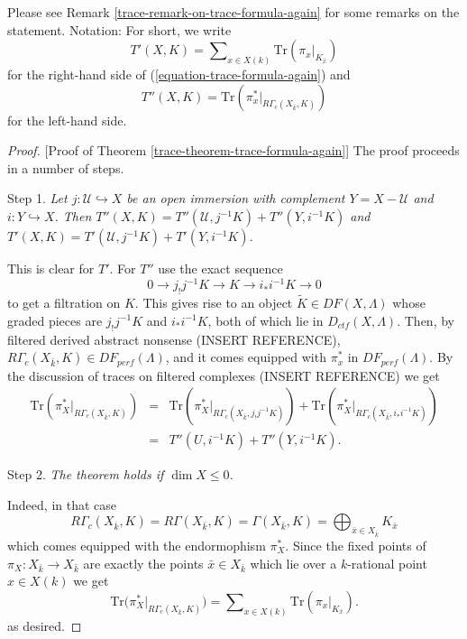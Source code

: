 Please see Remark \ref{trace-remark-on-trace-formula-again} for some remarks
on the statement. Notation: For short, we write
$$
T'(X, K) =
\sum\nolimits_{x\in X(k)}
\text{Tr}(\pi_x |_{K_{\bar x}})
$$
for the right-hand side of (\ref{equation-trace-formula-again}) and
$$
T''(X, K)
=\text{Tr}(\pi_x^* |_{R\Gamma_c(X_{\bar k}, K)})
$$
for the left-hand side.

\begin{proof}
[Proof of Theorem \ref{trace-theorem-trace-formula-again}]
The proof proceeds in a number of steps.

\medskip\noindent
Step 1. {\it Let $j : \mathcal{U}\hookrightarrow X$ be an open immersion with
complement $Y = X - \mathcal{U}$ and $i : Y \hookrightarrow X$. Then
$T''(X, K) = T''(\mathcal{U}, j^{-1} K)+ T''(Y, i^{-1}K)$ and
$T'(X, K) = T'(\mathcal{U}, j^{-1} K)+ T'(Y, i^{-1}K)$.}

\medskip\noindent
This is clear for $T'$. For $T''$ use the exact sequence
$$
0\to j_!j^{-1} K \to K \to i_* i^{-1} K \to 0
$$
to get a filtration on $K$. This gives rise to an object
$\widetilde K \in DF(X, \Lambda)$
whose graded pieces are $j_!j^{-1}K$ and $i_*i^{-1}K$,
both of which lie in $D_{ctf}(X, \Lambda)$. Then, by filtered derived
abstract nonsense (INSERT REFERENCE),
$R\Gamma_c(X_{\bar k}, K)\in DF_{perf}(\Lambda)$,
and it comes equipped with $\pi_x^*$ in
$DF_{perf}(\Lambda)$.
By the discussion of traces on filtered complexes (INSERT REFERENCE) we get
\begin{eqnarray*}
\text{Tr}(\pi_X^* |_{R\Gamma_c(X_{\bar k}, K)})
& = & \text{Tr}(\pi_X^* |_{R\Gamma_c(X_{\bar k}, j_!j^{-1}K)}) +
\text{Tr}(\pi_X^* |_{R\Gamma_c(X_{\bar k}, i_*i^{-1}K)}) \\
& = & T''(U, i^{-1}K) + T''(Y, i^{-1}K).
\end{eqnarray*}

Step 2. {\it The theorem holds if $\dim X\leq 0$. }

\medskip\noindent
Indeed, in that case
$$
R\Gamma_c(X_{\bar k}, K) = R\Gamma(X_{\bar k}, K) = \Gamma(X_{\bar k}, K) =
\bigoplus\nolimits_{\bar x \in X_{\bar k}} K_{\bar x}
$$
which comes equipped with the endormophism $\pi_X^*$.
Since the fixed points of $\pi_X : X_{\bar k}\to X_{\bar k}$ are exactly the
points $\bar x \in X_{\bar k}$ which lie over a $k$-rational point $x \in X(k)$
we get
$$
\text{Tr}\big(\pi_X^*|_{R\Gamma_c(X_{\bar k}, K)}\big) =
\sum\nolimits_{x \in X(k)} \text{Tr}(\pi_x|_{K_{\bar x}}).
$$
as desired.


\end{proof}
